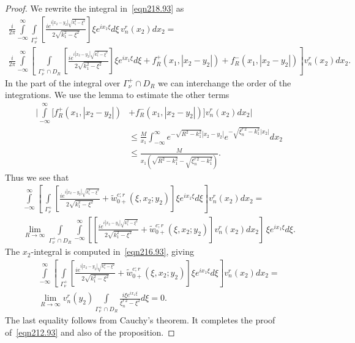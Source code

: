 \documentclass[10pt,a4paper]{amsart}
\newcommand\tw{\tilde w_{0+}}
\begin{document}
\begin{proof}
     We rewrite the integral in~\eqref{eqn218.93} as
     \begin{multline}
       \frac{i}{2\pi}
    \int\limits_{-\infty}^{\infty}\int\limits_{\Gamma_{\nu}^+}
    \left[\frac{ie^{i|x_2-y_2|\sqrt{k_1^2-\xi^2}}}{2\sqrt{k_1^2-\xi^2}}\right]\xi
    e^{ix_1\xi}d\xi\, v_n^{r}(x_2)dx_2=\\
    \frac{i}{2\pi}
    \int\limits_{-\infty}^{\infty}\left[\,\int\limits_{\Gamma_{\nu}^+\cap D_R}
      \left[\frac{ie^{i|x_2-y_2|\sqrt{k_1^2-\xi^2}}}{2\sqrt{k_1^2-\xi^2}}\right]\xi
      e^{ix_1\xi}d\xi+f_R^+(x_1,|x_2-y_2|)+
    f_R^-(x_1,|x_2-y_2|)\right] v_n^{r}(x_2)dx_2.
     \end{multline}
     In the part of the integral over $\Gamma_{\nu}^+\cap D_R$ we can
     interchange the order of the integrations. We use the lemma to estimate
     the other terms
     \begin{equation}
       \begin{split}
       \Bigg| \int\limits_{-\infty}^{\infty}[f_R^+(x_1,|x_2-y_2|)&+
         f_R^-(x_1,|x_2-y_2|)] v_n^{r}(x_2)dx_2\Bigg| \\
       &\leq
       \frac{M}{x_1}\int_{-\infty}^{\infty}e^{-\sqrt{R^2-k_1^2}|x_2-y_2|}e^{-\sqrt{\xi_n^{r\,2}-k_1^2}|x_2|}dx_2\\
       &\leq\frac{M}{x_1(\sqrt{R^2-k_1^2}-\sqrt{\xi_n^{r\,2}-k_1^2})}.
       \end{split}
     \end{equation}
     Thus we see that
       \begin{multline}\label{eqn227.93}
       \int\limits_{-\infty}^{\infty}\left[\,\int\limits_{\Gamma_{\nu}^+}
    \left[\frac{ie^{i|x_2-y_2|\sqrt{k_1^2-\xi^2}}}{2\sqrt{k_1^2-\xi^2}}+
       \tw^{c;r}(\xi,x_2;y_2)\right]\xi e^{ix_1\xi}d\xi\right]
    v_n^{r}(x_2)dx_2=\\
    \lim_{R\to\infty}
     \int\limits_{\Gamma_{\nu}^+\cap  D_R}\int\limits_{-\infty}^{\infty}\left[
    \left[\frac{ie^{i|x_2-y_2|\sqrt{k_1^2-\xi^2}}}{2\sqrt{k_1^2-\xi^2}}+
       \tw^{c;r}(\xi,x_2;y_2)\right]v_n^{r}(x_2)dx_2\right]\,\xi e^{ix_1\xi}
    d\xi.
       \end{multline}
       The $x_2$-integral is computed in~\eqref{eqn216.93}, giving
     \begin{multline}\label{eqn228.93}
      \int\limits_{-\infty}^{\infty}\left[\,\int\limits_{\Gamma_{\nu}^+}
    \left[\frac{ie^{i|x_2-y_2|\sqrt{k_1^2-\xi^2}}}{2\sqrt{k_1^2-\xi^2}}+
       \tw^{c;r}(\xi,x_2;y_2)\right]\xi e^{ix_1\xi}d\xi\right]
    v_n^{r}(x_2)dx_2=\\
    \lim_{R\to\infty}
     v_n^{r}(y_2)\int\limits_{\Gamma_{\nu}^+\cap  D_R}\frac{i\xi e^{ix_1\xi}}{\xi_n^{r\,2}-\xi^2} d\xi=0.   
     \end{multline}
    The last equality follows from Cauchy's theorem. It completes the proof
    of~\eqref{eqn212.93} and also of the proposition.
\end{proof}
\end{document}
